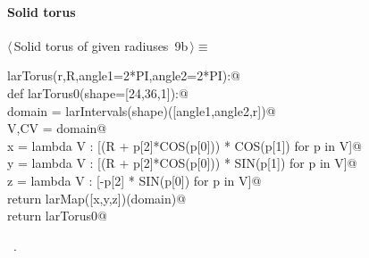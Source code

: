 \documentclass[11pt,oneside]{article}	%
\begin{document}
\paragraph{Solid torus}
\begin{flushleft} \small \label{scrap18}
\protect{}$\langle\,$Solid torus of given radiuses\nobreak\ {\footnotesize 9b}$\,\rangle\equiv$
\vspace{-1ex}
\begin{list}{}{} \item
\mbox{}\verb@def larTorus(r,R,angle1=2*PI,angle2=2*PI):@\\
\mbox{}\verb@   def larTorus0(shape=[24,36,1]):@\\
\mbox{}\verb@      domain = larIntervals(shape)([angle1,angle2,r])@\\
\mbox{}\verb@      V,CV = domain@\\
\mbox{}\verb@      x = lambda V : [(R + p[2]*COS(p[0])) * COS(p[1]) for p in V]@\\
\mbox{}\verb@      y = lambda V : [(R + p[2]*COS(p[0])) * SIN(p[1]) for p in V]@\\
\mbox{}\verb@      z = lambda V : [-p[2] * SIN(p[0]) for p in V]@\\
\mbox{}\verb@      return larMap([x,y,z])(domain)@\\
\mbox{}\verb@   return larTorus0@\\
\mbox{}\verb@@{\NWsep}
\end{list}
\vspace{-1ex}
\footnotesize\addtolength{\baselineskip}{-1ex}
\begin{list}{}{\setlength{\itemsep}{-\parsep}\setlength{\itemindent}{-\leftmargin}}
\item \NWtxtMacroRefIn\ .
\end{list}
\end{flushleft}
\end{document}
